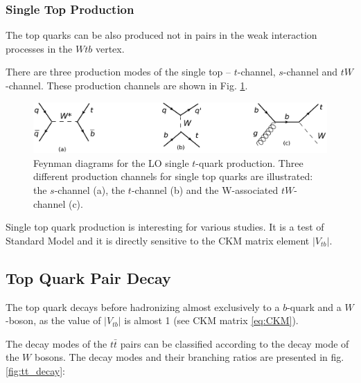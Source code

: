 \subsubsection{Single Top Production}

The top quarks can be also produced not in pairs in the weak interaction processes in the $Wtb$ vertex.

There are three production modes of the single top -- $t$-channel, $s$-channel and $tW$-channel. These production channels are shown in Fig. \ref{fig:single_t_prod}.

\begin{figure}[h]
  \centering
  \includegraphics[width=1.0\textwidth]{01_Theory_SM/plots/single_top_uniform.png}
  \caption{Feynman diagrams for the LO single $t$-quark production. Three different production channels for single top quarks are illustrated: 
  the $s$-channel (a), the $t$-channel (b) and the W-associated $tW$-channel (c).}
  \label{fig:single_t_prod}
\end{figure}

Single top quark production is interesting for various studies. It is a test of Standard Model and it is directly sensitive to the CKM matrix
element $|V_{tb}|$.

\subsection{Top Quark Pair Decay}\label{ssec:tdecay}

The top quark decays before hadronizing almost exclusively to a $b$-quark and a $W$-boson, as the value of $|V_{tb}|$ is almost 1 (see CKM matrix \ref{eq:CKM}).

The decay modes of the $t\bar{t}$ pairs can be classified according to the decay mode of the $W$ bosons. The decay modes and their branching ratios are presented
in fig. \ref{fig:tt_decay}:

